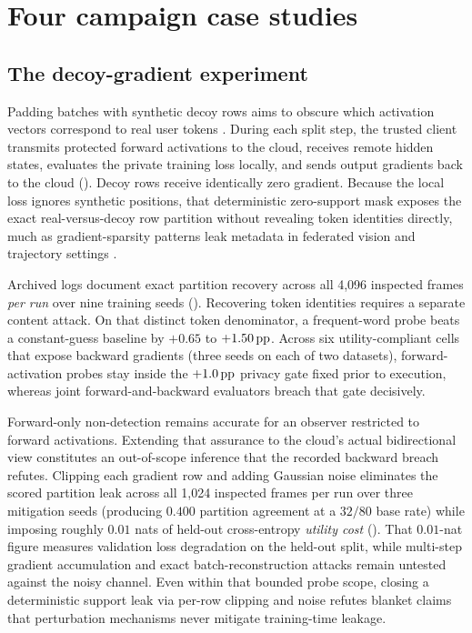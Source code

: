 \section{Four campaign case studies}
\label{sec:cases}

\subsection{The decoy-gradient experiment}
\label{sec:f1}

Padding batches with synthetic decoy rows aims to obscure which activation
vectors correspond to real user tokens \cite{paper1}. During each split
step, the trusted client transmits protected forward activations to the
cloud, receives remote hidden states, evaluates the private training loss
locally, and sends output gradients back to the cloud ().
Decoy rows receive identically zero gradient. Because the local loss
ignores synthetic positions, that deterministic zero-support mask exposes
the exact real-versus-decoy row partition without revealing token
identities directly, much as gradient-sparsity patterns leak metadata in
federated vision and trajectory settings \cite{gisurvey2022,trace2026}.

Archived logs document exact partition recovery across all 4,096 inspected
frames \emph{per run} over nine training seeds (). Recovering
token identities requires a separate content attack. On that distinct token
denominator, a frequent-word probe beats a constant-guess baseline by
$+0.65$ to $+1.50\,\mathrm{pp}$. Across six utility-compliant cells that expose
backward gradients (three seeds on each of two datasets),
forward-activation probes stay inside the $+1.0\,\mathrm{pp}$ privacy gate fixed
prior to execution, whereas joint forward-and-backward evaluators breach
that gate decisively.

Forward-only non-detection remains accurate for an observer restricted to
forward activations. Extending that assurance to the cloud's actual
bidirectional view constitutes an out-of-scope inference that the recorded
backward breach refutes. Clipping each gradient row and adding Gaussian
noise eliminates the scored partition leak across all 1,024 inspected
frames per run over three mitigation seeds (producing $0.400$ partition
agreement at a $32/80$ base rate) while imposing roughly $0.01$ nats of
held-out cross-entropy \emph{utility cost} (). That
$0.01$-nat figure measures validation loss degradation on the held-out
split, while multi-step gradient accumulation and exact
batch-reconstruction attacks \cite{dager2024,fedspy2026} remain untested
against the noisy channel. Even within that bounded probe scope, closing a
deterministic support leak via per-row clipping and noise refutes blanket
claims that perturbation mechanisms never mitigate training-time leakage.

